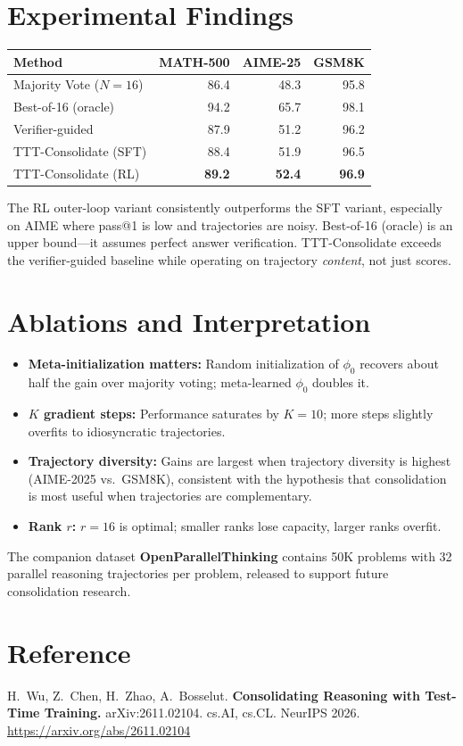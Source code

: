 \documentclass[10pt,twocolumn]{article}
\begin{document}
\section{Experimental Findings}

\begin{center}
\small
\begin{tabular}{lrrr}
\toprule
\textbf{Method} & \textbf{MATH-500} & \textbf{AIME-25} & \textbf{GSM8K} \\
\midrule
Majority Vote ($N=16$) & 86.4 & 48.3 & 95.8 \\
Best-of-16 (oracle) & 94.2 & 65.7 & 98.1 \\
Verifier-guided & 87.9 & 51.2 & 96.2 \\
TTT-Consolidate (SFT) & 88.4 & 51.9 & 96.5 \\
TTT-Consolidate (RL) & \textbf{89.2} & \textbf{52.4} & \textbf{96.9} \\
\bottomrule
\end{tabular}
\end{center}

The RL outer-loop variant consistently outperforms the SFT variant, especially on AIME where pass@1 is low and trajectories are noisy.
Best-of-16 (oracle) is an upper bound---it assumes perfect answer verification.
TTT-Consolidate exceeds the verifier-guided baseline while operating on trajectory \emph{content}, not just scores.

\section{Ablations and Interpretation}

\begin{itemize}[leftmargin=1em,itemsep=2pt]
  \item \textbf{Meta-initialization matters:} Random initialization of $\phi_0$ recovers about half the gain over majority voting; meta-learned $\phi_0$ doubles it.
  \item \textbf{$K$ gradient steps:} Performance saturates by $K=10$; more steps slightly overfits to idiosyncratic trajectories.
  \item \textbf{Trajectory diversity:} Gains are largest when trajectory diversity is highest (AIME-2025 vs.\ GSM8K), consistent with the hypothesis that consolidation is most useful when trajectories are complementary.
  \item \textbf{Rank $r$:} $r=16$ is optimal; smaller ranks lose capacity, larger ranks overfit.
\end{itemize}

The companion dataset \textbf{OpenParallelThinking} contains 50K problems with 32 parallel reasoning trajectories per problem, released to support future consolidation research.

\section*{Reference}
H.\ Wu, Z.\ Chen, H.\ Zhao, A.\ Bosselut.
\textbf{Consolidating Reasoning with Test-Time Training.}
arXiv:2611.02104. cs.AI, cs.CL. NeurIPS 2026.
\url{https://arxiv.org/abs/2611.02104}
\end{document}
